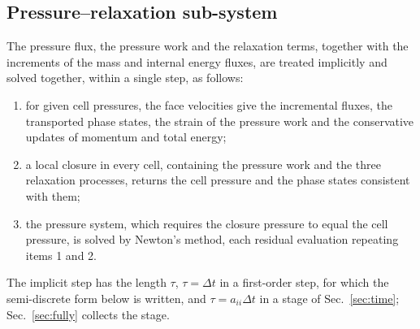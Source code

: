 \documentclass[a4paper,fleqn]{cas-sc}
\begin{document}
\subsection{Pressure--relaxation sub-system}
\label{sec:implicit}
The pressure flux, the pressure work and the relaxation terms, together with the increments of the mass and internal energy
fluxes, are treated implicitly and solved together, within a single step, as follows:
\begin{enumerate}
\item for given cell pressures, the face velocities give the incremental fluxes, the transported phase states, the
strain of the pressure work and the conservative updates of momentum and total energy;
\item a local closure in every cell, containing the pressure work and the three relaxation processes, returns the cell
pressure and the phase states consistent with them;
\item the pressure system, which requires the closure pressure to equal the cell pressure, is solved by Newton's method,
each residual evaluation repeating items 1 and 2.
\end{enumerate}
The implicit step has the length $\tau$, $\tau=\Delta t$ in a first-order step, for which the semi-discrete form below is
written, and $\tau=a_{ii}\Delta t$ in a stage of Sec.~\ref{sec:time}; Sec.~\ref{sec:fully} collects the stage.
\end{document}
